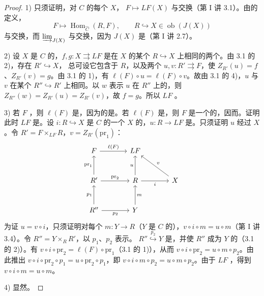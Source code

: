 \begin{proof}
1) 只须证明，对 $C$ 的每个 $X$， $F\mapsto LF(X)$ 与交换（第 I 讲 3.1）。由的定义，
\[F\longmapsto\operatorname{Hom}_{\widehat C}(R,F),\qquad R\hookrightarrow X\in\operatorname{ob}(J(X))\]
与交换，而 $\varinjlim_{J(X)}$ 与交换，因为 $J(X)$ 是（第 I 讲 2.7）。

2) 设 $X$ 是 $C$ 的，$f,g:X\rightrightarrows LF$ 是在 $X$ 的某个 $R\hookrightarrow X$ 上相同的两个。由 3.1 的 2)，存在 $R'\hookrightarrow X$，
总可设它包含于 $R$，以及两个 $u,v:R'\rightrightarrows F$，使 $Z_{R'}(u)=f$、$Z_{R'}(v)=g$。由 3.1 的 1)，有 $\ell(F)\circ u=\ell(F)\circ v$。故由 3.1 的 4)，$u$ 与 $v$ 在某个 $R''\hookrightarrow R'$ 上相同。以 $w$ 表示 $u$ 在 $R''$ 上的，则 $Z_{R''}(w)=Z_{R'}(u)=Z_{R'}(v)$，故 $f=g$。所以 $LF$ 。

3) 若 $F$ ，则 $\ell(F)$ 是，因为的是。若 $\ell(F)$ 是，则 $F$ 是一个的，因而。证明此时 $LF$ 是。设 $i:R\hookrightarrow X$ 是 $C$ 的一个 $X$ 的，$u:R\to LF$ 是。只须证明 $u$ 经过 $X$ 。令 $R'=F\times_{LF}R$，$v=Z_{R'}(\mathrm{pr}_1)$：
\[
\begin{tikzcd}[column sep=large,row sep=large]
F\arrow[r,"\ell(F)"]&LF\\
R'\arrow[u,"\mathrm{pr}_1"]\arrow[r,"\mathrm{pr}_2"]&R\arrow[u,"u"]\arrow[r,"i"']&X\arrow[ul,"v"']\\
R''\arrow[u,"p_1"]\arrow[r,"p_2"']&Y\arrow[u,"m"']
\end{tikzcd}
\]
为证 $u=v\circ i$，只须证明对每个 $m:Y\to R$（$Y$ 是 $C$ 的），$v\circ i\circ m=u\circ m$（第 I 讲 3.4）。令 $R''=Y\times_RR'$，以 $p_1$、$p_2$ 表示。 $R''\overset{p_2}{\hookrightarrow}Y$ 是，并使 $R''$ 成为 $Y$ 的（3.1 的 2)）。有 $v\circ i\circ\mathrm{pr}_2=\ell(F)\circ\mathrm{pr}_1$（3.1 的 1)），从而 $v\circ i\circ\mathrm{pr}_2=u\circ m\circ p_2$。由此推出 $v\circ i\circ\mathrm{pr}_2\circ p_1=u\circ\mathrm{pr}_2\circ p_1$，即 $v\circ i\circ m\circ p_2=u\circ m\circ p_2$。由于 $LF$ ，得到 $v\circ i\circ m=u\circ m$。

4) 显然。
\end{proof}
